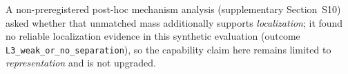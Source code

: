 
A non-preregistered post-hoc mechanism analysis (supplementary Section~S10) asked whether
that unmatched mass additionally supports \emph{localization}; it found no reliable
localization evidence in this synthetic evaluation (outcome \texttt{L3_weak_or_no_separation}), so the
capability claim here remains limited to \emph{representation} and is not upgraded.
